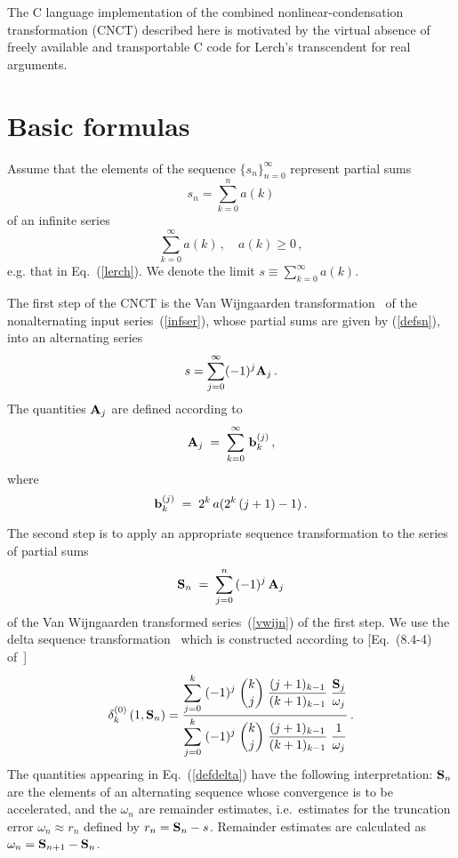 \documentclass[11pt]{article}
\begin{document}
The C language implementation of the combined nonlinear-condensation 
transformation (CNCT) described here is motivated by the virtual absence 
of freely available and transportable C code for Lerch's transcendent 
for real arguments. 

%
%
\section{Basic formulas}

Assume that the elements of
the sequence $\{ s_n \}_{n=0}^{\infty}$
represent partial sums 
%
\begin{equation}
\label{defsn}
s_n = \sum_{k=0}^{n} a(k)
\end{equation}
%
of an infinite series
%
\begin{equation}
\label{infser}
\sum_{k=0}^{\infty} a(k)\,,
\quad a(k) \geq 0\,,
\end{equation}
%
e.g. that in Eq.~(\ref{lerch}). We denote 
the limit $s \equiv \sum_{k=0}^{\infty} a(k)$. 

The first step of the CNCT is the Van Wijngaarden 
transformation~\cite{vW1965} of the
nonalternating input series~(\ref{infser}), whose partial 
sums are given by (\ref{defsn}), into an alternating
series
%
\begin{equation}
\label{vwijn}
s = \sum_{j=0}^{\infty} (-1)^j {\bf A}_j\,.
\end{equation}
%
The quantities ${\bf A}_j$ are defined according to 
%
\begin{equation}
\label{A2B}
{\bf A}_j \; = \; \sum_{k=0}^{\infty} \, {\bf b}_{k}^{(j)} \, ,
\end{equation}
%
where
%
\begin{equation}
\label{B2a}
{\bf b}_{k}^{(j)} \; = \; 2^k \, a(2^k\,(j+1)-1) \, .
\end{equation}

The second step is to apply an appropriate sequence transformation 
to the series of partial sums
%
\begin{equation}
\label{PSumS}
{\bf S}_n \; = \; \sum_{j=0}^{n} \, (-1)^j \, {\bf A}_j
\end{equation}
%
of the Van Wijngaarden transformed series~(\ref{vwijn}) of the first step.  
We use the delta sequence transformation~\cite{Si1979,We1989} which is 
constructed according to [Eq.~(8.4-4) of~\cite{We1989}]
%
\begin{equation}
\label{defdelta}
\delta_{k}^{(0)} \left( 1, {\bf S}_n \right) = \frac
{\displaystyle \sum_{j=0}^{k} \; ( - 1)^{j} \; 
{k \choose j} \; 
\frac {(j+1 )_{k-1}} {(k+1 )_{k-1}} \;
\frac {{\bf S}_{j}} {\omega_{j}} }
{\displaystyle \sum_{j=0}^{k} \; ( - 1)^{j} \; 
{k \choose j} \; 
\frac {(j+1 )_{k-1}} {(k+1 )_{k-1}} \;
\frac {1} {\omega_{j}} } \, .
\end{equation}
%
The quantities appearing in Eq.~(\ref{defdelta})
have the following interpretation: ${\bf S}_n$ are the elements of an 
alternating sequence whose convergence is to be accelerated, and the
$\omega_n$ are remainder estimates, i.e.~estimates for the
truncation error $\omega_n \approx r_n$ defined by $r_n = {\bf S}_n - s$.  
Remainder estimates are calculated as $\omega_n = {\bf S}_{n+1} - {\bf S}_n$.
\end{document}
